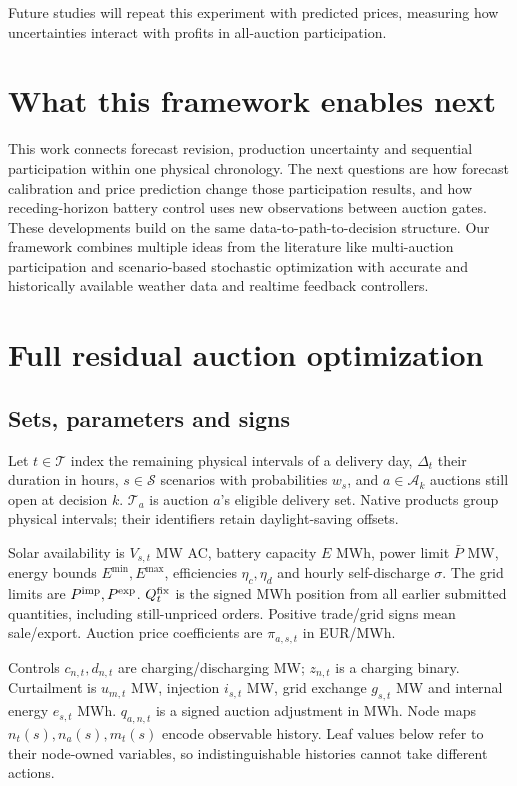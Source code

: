\documentclass[11pt,a4paper]{article}
\begin{document}
Future studies will repeat this experiment with predicted prices, measuring 
how uncertainties interact with profits in all-auction participation.

\section{What this framework enables next}
This work connects forecast revision, production uncertainty and
sequential participation within one physical chronology. The next questions
are how forecast calibration and price prediction change those participation
results, and how receding-horizon battery control uses new observations between
auction gates. These developments build on the same data-to-path-to-decision
structure. Our framework combines multiple ideas from the literature like multi-auction 
participation and scenario-based stochastic optimization with accurate and historically 
available weather data and realtime feedback controllers.

\clearpage
\appendix

\section{Full residual auction optimization}
\label{app:auction}
\subsection{Sets, parameters and signs}
Let $t\in\mathcal T$ index the remaining physical intervals of a delivery day,
$\Delta_t$ their duration in hours, $s\in\mathcal S$ scenarios with probabilities
$w_s$, and $a\in\mathcal A_k$ auctions still open at decision $k$.
$\mathcal T_a$ is auction $a$'s eligible delivery set. Native products group
physical intervals; their identifiers retain daylight-saving offsets.

Solar availability is $V_{s,t}$ MW AC, battery capacity $E$ MWh, power limit
$\bar P$ MW, energy bounds $E^{\min},E^{\max}$, efficiencies $\eta_c,\eta_d$
and hourly self-discharge $\sigma$. The grid limits are $P^{\rm imp},P^{\rm exp}$.
$Q_t^{\rm fix}$ is the signed MWh position from all earlier submitted quantities,
including still-unpriced orders. Positive trade/grid signs mean sale/export.
Auction price coefficients are $\pi_{a,s,t}$ in EUR/MWh.

Controls $c_{n,t},d_{n,t}$ are charging/discharging MW; $z_{n,t}$ is a charging
binary. Curtailment is $u_{m,t}$ MW, injection $i_{s,t}$ MW, grid exchange
$g_{s,t}$ MW and internal energy $e_{s,t}$ MWh. $q_{a,n,t}$ is a signed auction
adjustment in MWh. Node maps $n_t(s),n_a(s),m_t(s)$ encode observable history.
Leaf values below refer to their node-owned variables, so indistinguishable
histories cannot take different actions.
\end{document}
